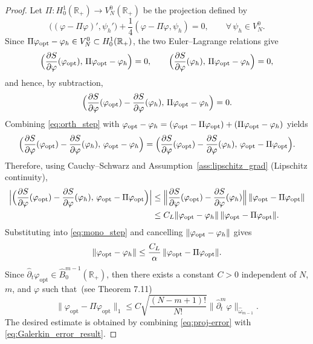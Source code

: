 \documentclass[a4paper,fleqn, 12pt]{cas-sc}
\numberwithin{table}{section}
\begin{document}
\begin{proof}
Let $\Pi: H_0^1(\mathbb{R}_+)\to V_N^0(\mathbb{R}_+)$ be the projection defined by
\[
\bigl( (\varphi-\Pi\varphi)', \psi_h'\bigr) 
+ \frac14 ( \varphi-\Pi\varphi, \psi_h)=0,
\qquad \forall\,\psi_h\in V_N^0.
\]
Since $\Pi\varphi_{\rm opt}-\varphi_h\in V_N^0\subset H_0^1(\mathbb{R}_+)$,
the two Euler--Lagrange relations give
\[
\Bigl(\frac{\partial S}{\partial\varphi}(\varphi_{\rm opt}),\,\Pi\varphi_{\rm opt}-\varphi_h\Bigr)=0,
\qquad
\Bigl(\frac{\partial S}{\partial\varphi}(\varphi_h),\,\Pi\varphi_{\rm opt}-\varphi_h\Bigr)=0,
\]
and hence, by subtraction,
\begin{equation}\label{eq:orth_step}
\Bigl(\frac{\partial S}{\partial\varphi}(\varphi_{\rm opt})
-\frac{\partial S}{\partial\varphi}(\varphi_h),\,\Pi\varphi_{\rm opt}-\varphi_h\Bigr)=0.
\end{equation}
Combining \eqref{eq:orth_step} with $\varphi_{\rm opt}-\varphi_h=(\varphi_{\rm opt}-\Pi\varphi_{\rm opt})+(\Pi\varphi_{\rm opt}-\varphi_h)$ yields
\[
\Bigl(\frac{\partial S}{\partial\varphi}(\varphi_{\rm opt})
-\frac{\partial S}{\partial\varphi}(\varphi_h),\,\varphi_{\rm opt}-\varphi_h\Bigr)
=
\Bigl(\frac{\partial S}{\partial\varphi}(\varphi_{\rm opt})
-\frac{\partial S}{\partial\varphi}(\varphi_h),\,\varphi_{\rm opt}-\Pi\varphi_{\rm opt}\Bigr).
\]
Therefore, using Cauchy--Schwarz and Assumption~\ref{ass:lipschitz_grad} (Lipschitz continuity),
\begin{align*}
\Bigl|\Bigl(\frac{\partial S}{\partial\varphi}(\varphi_{\rm opt})
-\frac{\partial S}{\partial\varphi}(\varphi_h),\,\varphi_{\rm opt}-\Pi\varphi_{\rm opt}\Bigr)\Bigr|
& \le
\Bigl\|\frac{\partial S}{\partial\varphi}(\varphi_{\rm opt})
-\frac{\partial S}{\partial\varphi}(\varphi_h)\Bigr\|\,
\|\varphi_{\rm opt}-\Pi\varphi_{\rm opt}\| \\*
& \le
C_L\|\varphi_{\rm opt}-\varphi_h\|\,\|\varphi_{\rm opt}-\Pi\varphi_{\rm opt}\|.    
\end{align*}
Substituting into \eqref{eq:mono_step} and cancelling $\|\varphi_{\rm opt}-\varphi_h\|$ gives
\begin{equation}\label{eq:Galerkin_error_result}
\|\varphi_{\rm opt}-\varphi_h\|\le \frac{C_L}{\alpha}\,\|\varphi_{\rm opt}-\Pi\varphi_{\rm opt}\|.    
\end{equation}
Since $\hat{\partial}_t \varphi_\text{opt} \in \hat{B}_{0}^{m-1}(\mathbb{R}_+)$, then there exists a constant $C > 0$ independent of $N$, $m$, and $\varphi$ such that~(see \cite{shen_spectral_2011} Theorem 7.11)
	\begin{equation} \label{eq:proj-error}
	\| \varphi_\text{opt} - \Pi \varphi_\text{opt} \|_1 \leq C \sqrt{\frac{(N-m+1)!}{N!}} \| \hat{\partial}_t^m \varphi \|_{\hat{\omega}_{m-1}}.	    
	\end{equation}
The desired estimate is obtained by combining \eqref{eq:proj-error}	with \eqref{eq:Galerkin_error_result}.
\end{proof}
\end{document}
